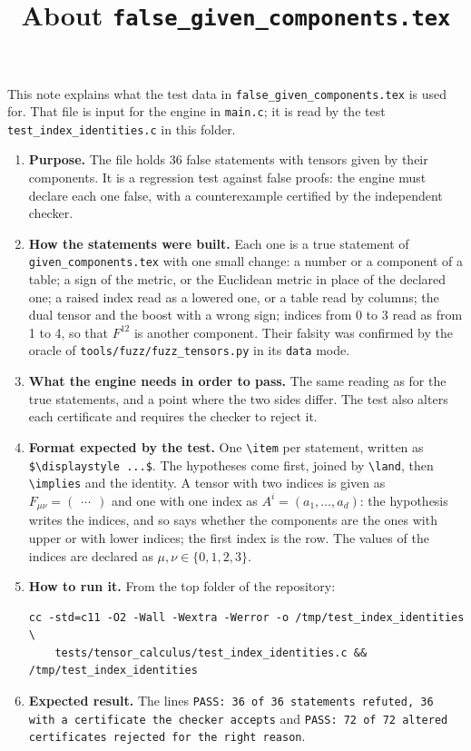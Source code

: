 \documentclass[11pt,a4paper]{article}
\title{About \texttt{false\_given\_components.tex}}
\author{}
\date{}
\begin{document}
\maketitle
This note explains what the test data in \texttt{false\_given\_components.tex} is used for. That file is input for the engine in \texttt{main.c}; it is read by the test \texttt{test\_index\_identities.c} in this folder.

\begin{enumerate}
\item \textbf{Purpose.} The file holds 36 false statements with tensors given by their components. It is a regression test against false proofs: the engine must declare each one false, with a counterexample certified by the independent checker.

\item \textbf{How the statements were built.} Each one is a true statement of \texttt{given\_components.tex} with one small change: a number or a component of a table; a sign of the metric, or the Euclidean metric in place of the declared one; a raised index read as a lowered one, or a table read by columns; the dual tensor and the boost with a wrong sign; indices from 0 to 3 read as from 1 to 4, so that $F^{12}$ is another component. Their falsity was confirmed by the oracle of \texttt{tools/fuzz/fuzz\_tensors.py} in its \texttt{data} mode.

\item \textbf{What the engine needs in order to pass.} The same reading as for the true statements, and a point where the two sides differ. The test also alters each certificate and requires the checker to reject it.

\item \textbf{Format expected by the test.} One \texttt{\textbackslash item} per statement, written as \texttt{\$\textbackslash displaystyle ...\$}. The hypotheses come first, joined by \texttt{\textbackslash land}, then \texttt{\textbackslash implies} and the identity. A tensor with two indices is given as $F_{\mu\nu} = \begin{pmatrix} \dots \end{pmatrix}$ and one with one index as $A^{i} = (a_1, \dots, a_d)$: the hypothesis writes the indices, and so says whether the components are the ones with upper or with lower indices; the first index is the row. The values of the indices are declared as $\mu, \nu \in \{0, 1, 2, 3\}$.

\item \textbf{How to run it.} From the top folder of the repository:
\begin{verbatim}
cc -std=c11 -O2 -Wall -Wextra -Werror -o /tmp/test_index_identities \
    tests/tensor_calculus/test_index_identities.c && /tmp/test_index_identities
\end{verbatim}

\item \textbf{Expected result.} The lines \texttt{PASS: 36 of 36 statements refuted, 36 with a certificate the checker accepts} and \texttt{PASS: 72 of 72 altered certificates rejected for the right reason}.

\end{enumerate}
\end{document}
